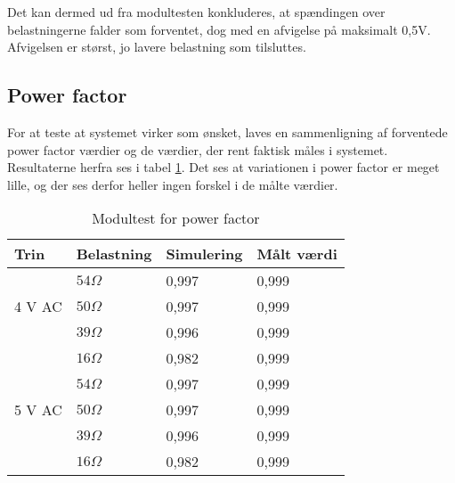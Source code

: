 Det kan dermed ud fra modultesten konkluderes, at spændingen over belastningerne falder som forventet, dog med en afvigelse på maksimalt 0,5V. Afvigelsen er størst, jo lavere belastning som tilsluttes. 


\subsection{Power factor}

For at teste at systemet virker som ønsket, laves en sammenligning af forventede power factor værdier og de værdier, der rent faktisk måles i systemet. Resultaterne herfra ses i tabel \ref{tab:Modultestpow}. Det ses at variationen i power factor er meget lille, og der ses derfor heller ingen forskel i de målte værdier. 
\begin{table}[H]
	\centering
	\begin{tabular}{|l|l|l|l|}
		\hline
		\textbf{Trin} & \textbf{Belastning} & \textbf{Simulering} & \textbf{Målt værdi} \\\hline
		
		\multirow{3}{*}{4 V AC} 
	
		& $54 \Omega$ & 0,997 &  0,999\\\hhline{~---} 
		& $50 \Omega$ &0,997  &  0,999\\\hhline{~---} 	
		& $39 \Omega$ & 0,996 &  0,999\\\hhline{~---} 
		& $16 \Omega$ & 0,982 &  0,999\\\hline 
		
		
		\multirow{3}{*}{5 V AC} 
	
		& $54 \Omega$ & 0,997 & 0,999 \\\hhline{~---} 
		& $50 \Omega$ & 0,997 & 0,999 \\\hhline{~---} 	
		& $39 \Omega$ & 0,996 & 0,999 \\\hhline{~---} 
		& $16 \Omega$ & 0,982 & 0,999 \\\hline 

		
	\end{tabular}
	\caption{Modultest for power factor}
	\label{tab:Modultestpow}
\end{table}